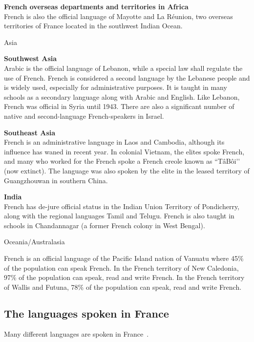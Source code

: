 \documentclass[]{../metanetpaper}
\begin{document}
\begin{multicols}{2}
{\bf French overseas departments and territories in Africa}\\
French is also the official language of Mayotte and La Réunion, two
overseas territories of France located in the southwest Indian Ocean.

\begin{center}
{\sc Asia}
\end{center}

{\bf Southwest Asia}\\ 
Arabic is the official language of Lebanon, while a special law shall
regulate the use of French. French is considered a second language by
the Lebanese people and is widely used, especially for administrative
purposes. It is taught in many schools as a secondary language along
with Arabic and English. Like Lebanon, French was official in Syria
until 1943. There are also a significant number of native and
second-language French-speakers in Israel.

{\bf Southeast Asia }\\
French is an administrative language in Laos and Cambodia, although
its influence has waned in recent year. In colonial Vietnam, the
elites spoke French, and many who worked for the French spoke a French
creole known as ``TâBôi{\mbox '}{\mbox '} (now extinct). The language was also spoken
by the elite in the leased territory of Guangzhouwan in southern
China.

{\bf India}\\
French has de-jure official status in the Indian Union Territory of
Pondicherry, along with the regional languages Tamil and
Telugu. French is also taught in schools in Chandannagar (a former
French colony in West Bengal).

\begin{center}
{\sc Oceania/Australasia}
\end{center}
French is an official language of the Pacific Island nation of Vanuatu
where 45\% of the population can speak French. In the French territory
of New Caledonia, 97\% of the population can speak, read and write
French. In the French territory of Wallis and Futuna, 78\% of the
population can speak, read and write French.

\subsection{The languages spoken in France}
\label{languageSpokenInTheFranceEn}
Many different languages are spoken in France~\cite{languesparleesfrance}.


\end{multicols}
\end{document}
